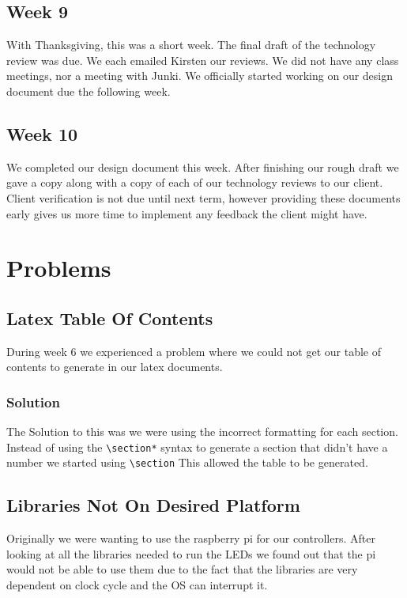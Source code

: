 \documentclass[onecolumn, draftclsnofoot,10pt, compsoc]{IEEEtran}
\begin{document}
		\subsection{Week 9}
		With Thanksgiving, this was a short week. The final draft of the technology review was due. We each emailed Kirsten our reviews.
		We did not have any class meetings, nor a meeting with Junki.
		We officially started working on our design document due the following week.

		\subsection{Week 10}
		We completed our design document this week. After finishing our rough draft we gave a copy along with a copy of each of our technology reviews to our client.
		Client verification is not due until next term, however providing these documents early gives us more time to implement any feedback the client might have.

		\section{Problems}
			\subsection{Latex Table Of Contents}
			During week 6 we experienced a problem where we could not get our table
			of contents to generate in our latex documents.
				\subsubsection{Solution}
				The Solution to this was we were using the incorrect formatting for each
				section. Instead of using the \verb|\section*| syntax to generate a section that
				didn't have a number we started using \verb|\section| This allowed the table
				to be generated.
			\subsection{Libraries Not On Desired Platform}
      Originally we were wanting to use the raspberry pi for our controllers. After
      looking at all the libraries needed to run the LEDs we found out that the
      pi would not be able to use them due to the fact that the libraries are very
      dependent on clock cycle and the OS can interrupt it.
\end{document}
